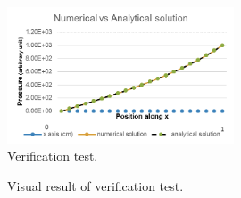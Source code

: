 \documentclass[a4paper, 11pt]{article} %
\begin{document}
\begin{figure}[htbp]
\centering
\includegraphics[width=0.6\textwidth]{./Fig/NumVsAnalSol.png}
\caption{Verification test.}
\label{fig:verif test}
\end{figure}

\begin{figure}[htbp]
\centering
{}
\caption{Visual result of verification test.}
\label{fig:verif visu}
\end{figure}
\end{document}
